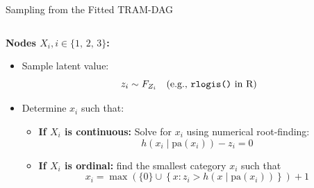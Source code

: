 \documentclass[onlytextwidth,english]{beamer}\usepackage[]{graphicx}\usepackage[]{xcolor}
\begin{document}
\begin{frame}{Sampling from the Fitted TRAM-DAG}

\begin{columns}

\begin{column}{0.65\textwidth}

\textbf{Nodes $X_i , i \in \{1,\, 2,\, 3\}$:}

\vspace{0.2cm}

\begin{itemize}
    \item Sample latent value: 
    \[
    z_i \sim F_{Z_i} \quad \text{(e.g., \texttt{rlogis()} in R)}
    \]

    \item Determine \(x_i\) such that:

    \begin{itemize}
        \item \textbf{If \(X_i\) is continuous:}
        Solve for \(x_i\) using numerical root-finding:
        \[
        h(x_i \mid \text{pa}(x_i)) - z_i = 0
        \]
        \item \textbf{If \(X_i\) is ordinal:}
        find the smallest category $x_i$ such that
        \[
        x_i = \max \left( \{0\} \cup \left\{ x : z_i > h(x \mid \text{pa}(x_i)) \right\} \right) + 1
        \]
        
    \end{itemize}
\end{itemize}

\end{column}


\end{columns}
\end{frame}
\end{document}
